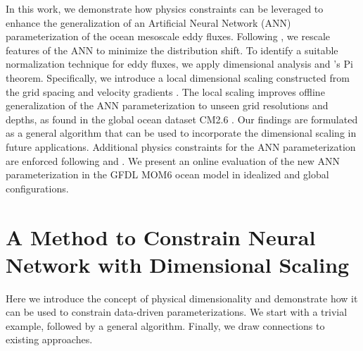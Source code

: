 \documentclass[draft]{agujournal2019}
\begin{document}
In this work, we demonstrate how physics constraints can be leveraged to enhance the generalization of an Artificial Neural Network (ANN) parameterization of the ocean mesoscale eddy fluxes. Following , we rescale features of the ANN to minimize the distribution shift. To identify a suitable normalization technique for eddy fluxes, we apply dimensional analysis and 's Pi theorem. Specifically, we introduce a local dimensional scaling constructed from the grid spacing and velocity gradients \cite{prakash2022invariant}. The local scaling improves offline generalization of the ANN parameterization to unseen grid resolutions and depths, as found in the global ocean dataset CM2.6 \cite{griffies2015impacts}. Our findings are formulated as a general algorithm that can be used to incorporate the dimensional scaling in future applications. Additional physics constraints for the ANN parameterization are enforced following  and . %
We present an online evaluation of the new ANN parameterization in the GFDL MOM6 ocean model \cite{adcroft2019gfdl} in idealized and global configurations.


\section{A Method to Constrain Neural Network with Dimensional Scaling} \label{sec:unit_invariance}

Here we introduce the concept of physical dimensionality and demonstrate how it can be used to constrain data-driven parameterizations. %
We start with a trivial example, followed by a general algorithm. Finally, we draw connections to existing approaches.
\end{document}
